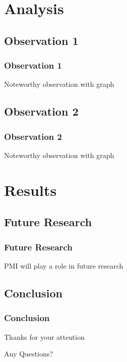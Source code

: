 \documentclass[10pt]{beamer}
\begin{document}
\section{Analysis}
\begin{frame}
\subsection{Observation 1}
\frametitle{Observation 1}

Noteworthy observation with graph


\end{frame}
\begin{frame}
\subsection{Observation 2}
\frametitle{Observation 2}

Noteworthy observation with graph

\end{frame}
\section{Results}
\begin{frame}
\subsection{Future Research}
\frametitle{Future Research}

PMI will play a role in future research

\end{frame}
\begin{frame}
\subsection{Conclusion}
\frametitle{Conclusion}

Thanks for your attention

\vspace{1cm}

Any Questions?

\end{frame}
\end{document}
